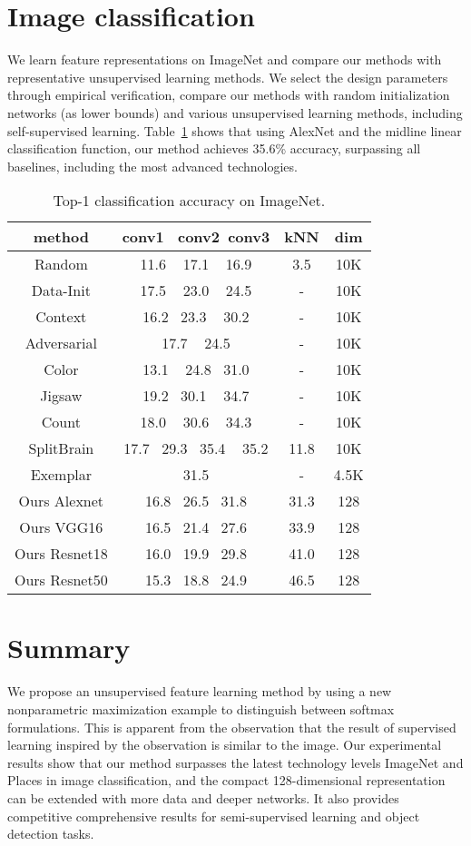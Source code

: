 \documentclass[a4paper,18pt]{article}
\begin{document}
 \section{Image classification} 
 We learn feature representations on ImageNet and compare our methods with representative unsupervised learning methods. We select the design parameters through empirical verification, compare our methods with random initialization networks (as lower bounds) and various unsupervised learning methods, including self-supervised learning\cite{Wang_2015_Unsupervised}. Table~\ref{table1} shows that using AlexNet and the midline linear classification function, our method achieves 35.6\% accuracy, surpassing all baselines, including the most advanced technologies.
 	\begin{table}[h]%
 	\centering 
 	\caption{ Top-1 classification accuracy on ImageNet.}\label{table1}
 	\tabcolsep 0.01in 
 	\begin{tabular} {|c|c|c|c|}
 		\hline 
 		
 		method& conv1 \ conv2\  conv3 & kNN &dim \\
 		\hline
 		Random &11.6 ~ 17.1 ~ 16.9 & 3.5& 10K\\
 		Data-Init& 17.5 ~ 23.0 ~ 24.5 &- &10K\\
 		Context & 16.2~  23.3 ~ 30.2 &- &10K\\
 		Adversarial & 17.7 ~ 24.5 & -& 10K\\
 		Color & 13.1 ~ 24.8~  31.0  &- &10K\\
 		Jigsaw\cite{Noroozi_2016_Unsupervised} & 19.2~  30.1 ~ 34.7& - &10K\\
 		Count & 18.0 ~ 30.6 ~ 34.3& - &10K\\
 		SplitBrain & 17.7~  29.3~  35.4 ~ 35.2 &11.8& 10K\\
 		\hline
 		Exemplar& 31.5& - &4.5K	 \\
 		\hline
 		Ours Alexnet& 16.8 ~26.5~ 31.8 &31.3& 128\\
 		Ours VGG16 &16.5~ 21.4~ 27.6 &33.9 &128\\
 		Ours Resnet18& 16.0 ~19.9~ 29.8 &41.0 &128\\
 		Ours Resnet50& 15.3~ 18.8~ 24.9 &46.5& 128\\
 		\hline
 		
 	\end{tabular}
 \end{table}
 \section{Summary}
 We propose an unsupervised feature learning method by using a new nonparametric maximization example to distinguish between softmax formulations. This is apparent from the observation that the result of supervised learning inspired by the observation is similar to the image. Our experimental results show that our method surpasses the latest technology levels ImageNet and Places in image classification, and the compact 128-dimensional representation can be extended with more data and deeper networks. It also provides competitive comprehensive results for semi-supervised learning and object detection tasks.
 
\end{document}
